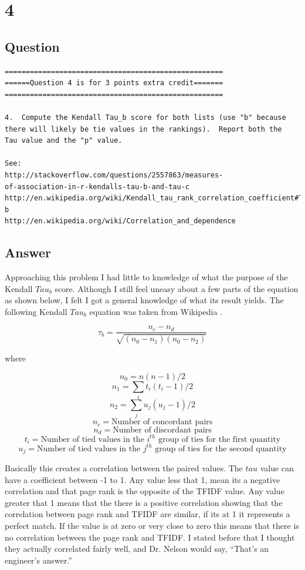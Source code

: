 \documentclass[letterpaper,11pt]{article}
\begin{document}
\clearpage


\section*{4}

\subsection*{Question}

\begin{verbatim}
====================================================
======Question 4 is for 3 points extra credit=======
====================================================

4.  Compute the Kendall Tau_b score for both lists (use "b" because
there will likely be tie values in the rankings).  Report both the
Tau value and the "p" value.

See: 
http://stackoverflow.com/questions/2557863/measures-
of-association-in-r-kendalls-tau-b-and-tau-c
http://en.wikipedia.org/wiki/Kendall_tau_rank_correlation_coefficient#Tau-b
http://en.wikipedia.org/wiki/Correlation_and_dependence
\end{verbatim}

\clearpage
\subsection*{Answer}

Approaching this problem I had little to knowledge of what the purpose of the Kendall $Tau_b$ score. Although I still feel uneasy about a few parts of the equation as shown below, I felt I got a general knowledge of what its result yields. The following Kendall $Tau_b$ equation was taken from Wikipedia \cite{wikipediaref}.

\[ \tau_b = \frac{n_c - n_d}{\sqrt{(n_0 - n_1)(n_0 - n_2)}} \]

where

\[ n_0 = n(n-1)/2 \]
\[ n_1 = \sum_i t_i (t_i - 1)/2 \]
\[ n_2 = \sum_j u_j (u_j - 1)/2 \]
\[ n_c = \textrm{Number of concordant pairs} \]
\[ n_d = \textrm{Number of discordant pairs} \]
\[ t_i = \textrm{Number of tied values in the $i^{th}$ group of ties for the first quantity} \]
\[ u_j = \textrm{Number of tied values in the $j^{th}$ group of ties for the second quantity} \]

Basically this creates a correlation between the paired values. The $tau$ value can have a coefficient between -1 to 1. Any value less that 1, mean its a negative correlation and that page rank is the opposite of the TFIDF value. Any value greater that 1 means that the there is a positive correlation showing that the correlation between page rank and TFIDF are similar, if its at 1 it represents a perfect match. If the value is at zero or very close to zero this means that there is no correlation between the page rank and TFIDF. I stated before that I thought they actually correlated fairly well, and Dr. Nelson would say, ``That's an engineer's answer.''
\end{document}
